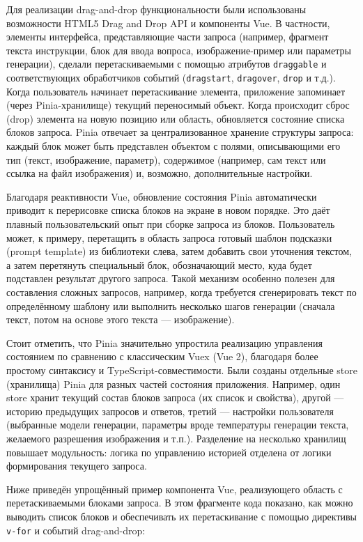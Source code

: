 Для реализации drag-and-drop функциональности были использованы возможности HTML5 Drag and Drop API и компоненты Vue. В частности, элементы интерфейса, представляющие части запроса (например, фрагмент текста инструкции, блок для ввода вопроса, изображение-пример или параметры генерации), сделали перетаскиваемыми с помощью атрибутов \verb|draggable| и соответствующих обработчиков событий (\verb|dragstart|, \verb|dragover|, \verb|drop| и т.д.). Когда пользователь начинает перетаскивание элемента, приложение запоминает (через Pinia-хранилище) текущий переносимый объект. Когда происходит сброс (drop) элемента на новую позицию или область, обновляется состояние списка блоков запроса. Pinia отвечает за централизованное хранение структуры запроса: каждый блок может быть представлен объектом с полями, описывающими его тип (текст, изображение, параметр), содержимое (например, сам текст или ссылка на файл изображения) и, возможно, дополнительные настройки.

Благодаря реактивности Vue, обновление состояния Pinia автоматически приводит к перерисовке списка блоков на экране в новом порядке. Это даёт плавный пользовательский опыт при сборке запроса из блоков. Пользователь может, к примеру, перетащить в область запроса готовый шаблон подсказки (prompt template)\cite{copilotworks:promptgen} из библиотеки слева, затем добавить свои уточнения текстом, а затем перетянуть специальный блок, обозначающий место, куда будет подставлен результат другого запроса. Такой механизм особенно полезен для составления сложных запросов, например, когда требуется сгенерировать текст по определённому шаблону или выполнить несколько шагов генерации (сначала текст, потом на основе этого текста — изображение).

Стоит отметить, что Pinia значительно упростила реализацию управления состоянием по сравнению с классическим Vuex (Vue 2), благодаря более простому синтаксису и TypeScript-совместимости. Были созданы отдельные store (хранилища) Pinia для разных частей состояния приложения. Например, один store хранит текущий состав блоков запроса (их список и свойства), другой — историю предыдущих запросов и ответов, третий — настройки пользователя (выбранные модели генерации, параметры вроде температуры генерации текста, желаемого разрешения изображения и т.п.). Разделение на несколько хранилищ повышает модульность: логика по управлению историей отделена от логики формирования текущего запроса.

Ниже приведён упрощённый пример компонента Vue, реализующего область с перетаскиваемыми блоками запроса. В этом фрагменте кода показано, как можно выводить список блоков и обеспечивать их перетаскивание с помощью директивы \verb|v-for| и событий drag-and-drop:

